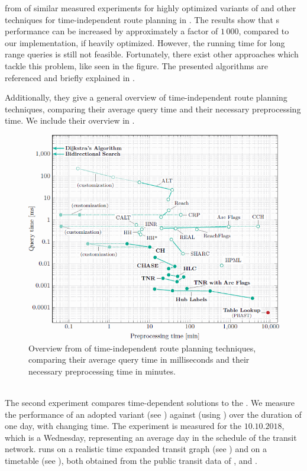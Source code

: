 	from  of similar measured experiments for highly optimized variants of \dijkstra and other
	techniques for \uniModal time-independent route planning in .
	The results show that {\dijkstra}s performance can be increased by approximately a factor of $1\,000$, compared to our implementation,
	if heavily optimized. However, the running time for long range queries is still not feasible. Fortunately, there exist other approaches
	which tackle this problem, like seen in the figure. The presented algorithms are referenced and briefly explained in .
	
	Additionally, they give a general overview of \uniModal time-independent route planning techniques, comparing their average query time and
	their necessary preprocessing time. We include their overview in .\\
	\begin{figure}[!ht]
		 \begin{center}
			\includegraphics[scale=0.75]{res/uniModalTimeIndependentResultsExternalOverview}
		\end{center}
		\caption{Overview from  of \uniModal time-independent route planning
			techniques, comparing their average query time in milliseconds and their necessary preprocessing time in minutes.}
		\label{uniModalTimeIndependentResultsExternalOverview}
	\end{figure}\quad\\
	The second experiment compares time-dependent solutions to the \shortestPathProblem. We measure the performance of an
	adopted \dijkstra variant (see ) against \csa (using ) over the duration of one day,
	with changing time. The experiment is measured for the $10.10.2018$, which is a Wednesday, representing an average day in the schedule
	of the transit network. \dijkstra runs on a realistic time expanded transit graph (see ) and \csa on a
	timetable (see ), both obtained from the public transit data of \freiburgR, \stuttgartR and \switzerlandR.
	
